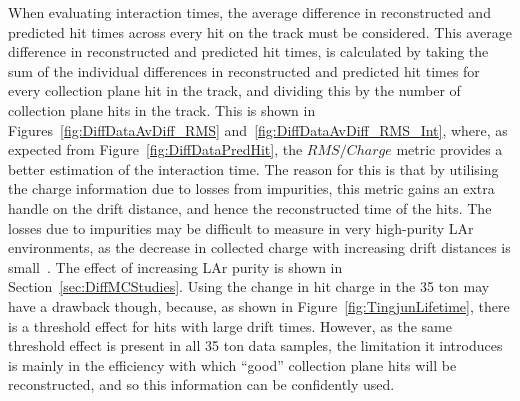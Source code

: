 When evaluating interaction times, the average difference in reconstructed and predicted hit times across every hit on the track must be considered. This average difference in reconstructed and predicted hit times, is calculated by taking the sum of the individual differences in reconstructed and predicted hit times for every collection plane hit in the track, and dividing this by the number of collection plane hits in the track. This is shown in Figures~\ref{fig:DiffDataAvDiff_RMS} and~\ref{fig:DiffDataAvDiff_RMS_Int}, where, as expected from Figure~\ref{fig:DiffDataPredHit}, the $RMS/Charge$ metric provides a better estimation of the interaction time. The reason for this is that by utilising the charge information due to losses from impurities, this metric gains an extra handle on the drift distance, and hence the reconstructed time of the hits. The losses due to impurities may be difficult to measure in very high-purity LAr environments, as the decrease in collected charge with increasing drift distances is small~\citep{LongBo}. The effect of increasing LAr purity is shown in Section~\ref{sec:DiffMCStudies}. Using the change in hit charge in the 35 ton may have a drawback though, because, as shown in Figure~\ref{fig:TingjunLifetime}, there is a threshold effect for hits with large drift times. However, as the same threshold effect is present in all 35 ton data samples, the limitation it introduces is mainly in the efficiency with which ``good'' collection plane hits will be reconstructed, and so this information can be confidently used. \\

